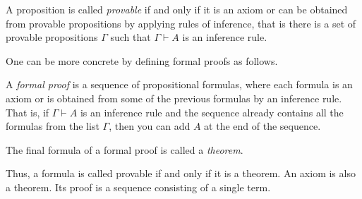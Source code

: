 \begin{page}
\setcounter{section}{2}
\setcounter{subsection}{1}
\setcounter{dfn}{1}
\label{portion:478}

\begin{dfn}
A proposition is called \emph{provable} if and only if it is an axiom or can be obtained from provable propositions by applying rules of inference,
that is there is a set of provable propositions $\Gamma$ such that $\Gamma \vdash A$ is an inference rule.
\end{dfn}

\end{page}

\begin{page}
\setcounter{section}{2}
\setcounter{subsection}{1}
\setcounter{dfn}{1}
\label{portion:479}


One can be more concrete by defining formal proofs as follows.

\end{page}

\begin{page}
\setcounter{section}{2}
\setcounter{subsection}{1}
\setcounter{dfn}{2}
\label{portion:481}

\begin{dfn}
\label{dfn:HilbertProof}
A \emph{formal proof} is a sequence of propositional formulas,
where each formula is an axiom or is obtained from some of the previous formulas by an inference rule.
That is, if $\Gamma \vdash A$ is an inference rule and the sequence already contains all the formulas from the list $\Gamma$,
then you can add $A$ at the end of the sequence.

The final formula of a formal proof is called a \emph{theorem}.
\end{dfn}

\end{page}

\begin{page}
\setcounter{section}{2}
\setcounter{subsection}{1}
\setcounter{dfn}{2}
\label{portion:482}

Thus, a formula is called provable if and only if it is a theorem.
An axiom is also a theorem.
Its proof is a sequence consisting of a single term.



\end{page}

